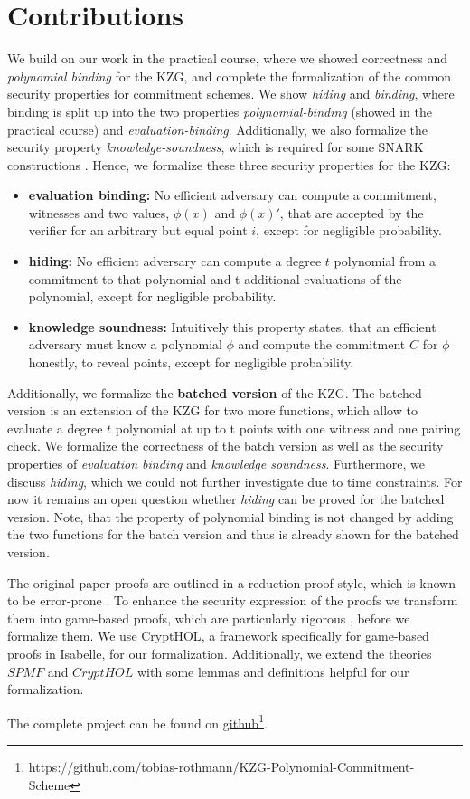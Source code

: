 \section*{Contributions}

We build on our work in the practical course, where we showed correctness and \textit{polynomial binding} for the KZG, and complete the formalization of the common security properties for commitment schemes. We show \textit{hiding} and \textit{binding}, where binding is split up into the two properties \textit{polynomial-binding} (showed in the practical course) and \textit{evaluation-binding}. Additionally, we also formalize the security property \textit{knowledge-soundness}, which is required for some SNARK constructions \parencite*{sonic,plonk}. Hence, we formalize these three security properties  for the KZG:
\begin{itemize}
    \item \textbf{evaluation binding:}
    No efficient adversary can compute a commitment, witnesses and two values, $\phi(x)$ and $\phi(x)'$, that are accepted by the verifier for an arbitrary but equal point $i$, except for negligible probability.
    \item \textbf{hiding:}
    No efficient adversary can compute a degree $t$ polynomial from a commitment to that polynomial and t additional evaluations of the polynomial, except for negligible probability.
    \item \textbf{knowledge soundness:}
    Intuitively this property states, that an efficient adversary must know a polynomial $\phi$ and compute the commitment $C$ for $\phi$ honestly, to reveal points, except for negligible probability. 
\end{itemize} 
Additionally, we formalize the \textbf{batched version} of the KZG\parencite*{KZG}. The batched version is an extension of the KZG for two more functions, which allow to evaluate a degree $t$ polynomial at up to t points with one witness and one pairing check. We formalize the correctness of the batch version as well as the security properties of \textit{evaluation binding} and \textit{knowledge soundness}. Furthermore, we discuss \textit{hiding}, which we could not further investigate due to time constraints. For now it remains an open question whether \textit{hiding} can be proved for the batched version. Note, that the property of polynomial binding is not changed by adding the two functions for the batch version and thus is already shown for the batched version. 

The original paper proofs are outlined in a reduction proof style, which is known to be error-prone \parencite{gamesB&R}. To enhance the security expression of the proofs we transform them into game-based proofs, which are particularly rigorous \parencite{shoup_games, gamesB&R}, before we formalize them. We use CryptHOL\parencite*{CryptHOL-AFP}, a framework specifically for game-based proofs in Isabelle, for our formalization. 
Additionally, we extend the theories $SPMF$ and $CryptHOL$ with some lemmas and definitions helpful for our formalization.

The complete project can be found on \href{https://github.com/tobias-rothmann/KZG-Polynomial-Commitment-Scheme}{github}\footnote{https://github.com/tobias-rothmann/KZG-Polynomial-Commitment-Scheme}.